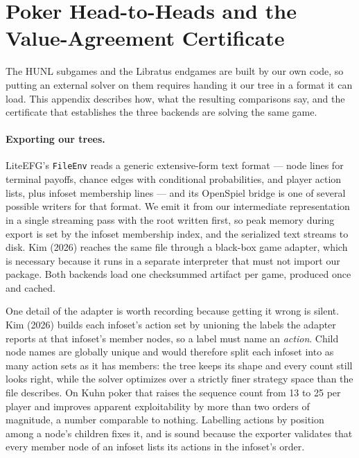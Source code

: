 \section{Poker Head-to-Heads and the Value-Agreement Certificate}
\label{app:libratus}

The HUNL subgames and the Libratus endgames are built by our own code, so putting an
external solver on them requires handing it our tree in a format it can load.
This appendix describes how, what the resulting comparisons say, and the certificate
that establishes the three backends are solving the same game.

\paragraph{Exporting our trees.}
LiteEFG's \texttt{FileEnv} reads a generic extensive-form text format --- node lines for
terminal payoffs, chance edges with conditional probabilities, and player action lists,
plus infoset membership lines --- and its OpenSpiel bridge is one of several possible writers for that format. We emit it from our intermediate representation in a
single streaming pass with the root written first, so peak memory during export is set by the
infoset membership index, and the serialized text streams to disk. Kim (2026) reaches the same
file through a black-box game adapter, which is necessary because it runs in a separate
interpreter that must not import our package. Both backends load one checksummed
artifact per game, produced once and cached.

One detail of the adapter is worth recording because getting it wrong is silent. Kim
(2026) builds each infoset's action set by unioning the labels the adapter reports at
that infoset's member nodes, so a label must name an \emph{action}. Child
node names are globally unique and would therefore split each infoset into as many
action sets as it has members: the tree keeps its shape and every count still looks
right, while the solver optimizes over a strictly finer strategy space than the file
describes. On Kuhn poker that raises the sequence count from 13 to 25 per player and
improves apparent exploitability by more than two orders of magnitude, a number
comparable to nothing. Labelling actions by position among a node's children fixes it,
and is sound because the exporter validates that every member node of an infoset lists
its actions in the infoset's order.

